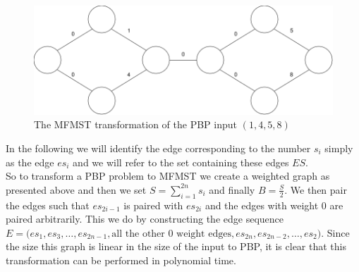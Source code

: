 \begin{figure}[h]
    \centering
    \includegraphics[width=0.6\linewidth]{Latex/Billeder/PBPToMFMSTExample.png}
    \caption{The MFMST transformation of the PBP input $(1,4,5,8)$}
    \label{fig:PBPToMFMSTExample}
\end{figure}
In the following we will identify the edge corresponding to the number $s_i$ simply as the edge $es_i$ and we will refer to the set containing these edges $ES$. 
\\
So to transform a PBP problem to MFMST we create a weighted graph as presented above and then we set $S=\sum_{i=1}^{2n}s_i$ and finally $B=\frac{S}{2}$. We then pair the edges such that $es_{2i-1}$ is paired with $es_{2i}$ and the edges with weight 0 are paired arbitrarily. This we do by constructing the edge sequence $E=\Big(es_1,es_3,\dots,es_{2n-1},\text{all the other 0 weight edges},es_{2n},es_{2n-2},\dots,es_{2}\Big)$. Since the size this graph is linear in the size of the input to PBP, it is clear that this transformation can be performed in polynomial time.

